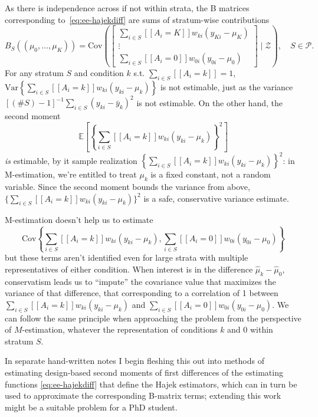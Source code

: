As there is independence across if not within strata, the
B matrices corresponding to~\eqref{eq:ee-hajekdiff} are sums of
stratum-wise contributions 
\begin{equation} \label{eq:Bform}
B_S((\mu_0, \ldots, \mu_K)) =  
\mathrm{Cov}\left(\left[
\begin{array}{c}
\sum_{i\in S} [\![A_i=K]\!] w_{ki} (y_{Ki} - \mu_K) \\
\vdots \\
\sum_{i\in S} [\![A_i=0]\!] w_{0i} (y_{0i} - \mu_0) 
\end{array}
\right] \mid \mathcal{Z}\right), \quad S \in \mathcal{P}. 
\end{equation}
For any stratum $S$ and condition $k$ s.t.  $\sum_{i \in S}  [\![A_i=k]\!] =1$, $\mathrm{Var}\left\{ \sum_{i\in S} [\![A_i=k]\!] w_{ki} (y_{ki} - \mu_k) \right\}$ is not estimable, just as the variance $[(\# S)-1]^{-1}\sum_{i \in S} (y_{ki} - \bar{y}_k)^2$ is not estimable. On the other hand, the second moment 
\[ \mathbb{E}\left[\left\{ \sum_{i\in S} [\![A_i=k]\!] w_{ki} (y_{ki} - \mu_k) \right\}^2\right]
\]
\textit{is} estimable, by it sample realization \(\left\{ \sum_{i\in
    S} [\![A_i=k]\!] w_{ki} (y_{ki} - \mu_k) \right\}^2\): in
M-estimation, we're entitled to treat $\mu_k$ is a fixed constant, not
a random variable. Since the second moment  bounds the variance from above,  \(\{\sum_{i\in S} [\![A_i=k]\!] w_{ki} (y_{ki} - \mu_k)\}^2\) is a safe, conservative variance estimate.  

M-estimation doesn't help us to estimate 
\[
\mathrm{Cov}\left\{
\sum_{i\in S} [\![A_i=k]\!] w_{ki} (y_{ki} - \mu_k), 
\sum_{i\in S} [\![A_i=0]\!] w_{0i} (y_{0i} - \mu_0) 
\right\}
\]
but these terms aren't identified even for large strata with multiple
representatives of either condition. When interest is in the
difference $\hat{\mu}_k - \hat{\mu}_0$, conservatism leads us to
``impute'' the covariance value that maximizes the variance of that difference, that
corresponding to a correlation of 1 between $\sum_{i\in S} [\![A_i=k]\!] w_{ki}
(y_{ki} - \mu_k)$ and $\sum_{i\in S} [\![A_i=0]\!] w_{0i} (y_{0i} -
\mu_0)$. We can follow the same principle when approaching the problem
from the perspective of $M$-estimation, whatever the representation of
conditions $k$ and 0 within stratum $S$.

In separate hand-written
notes I begin fleshing this out into methods of estimating design-based second
moments of first differences of the estimating functions
\eqref{eq:ee-hajekdiff} that define the Hajek estimators, which
can in turn be used to approximate the corresponding B-matrix terms;
extending this work might be a suitable problem for a PhD student. 

